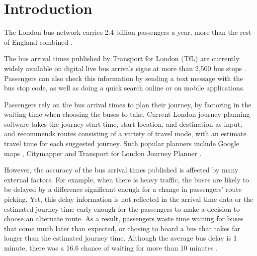 \chapter{Introduction}

The London bus network carries 2.4 billion passengers a year, more than the rest of England combined \cite{tfl_annual_report_13/14}.

\par The bus arrival times published by Transport for London (TfL) are currently widely available on digital live bus arrivals signs at more than 2,500 bus stops \cite{live_bus_arrivals}. Passengers can also check this information by sending a text message with the bus stop code, as well as doing a quick search online or on mobile applications.



\par Passengers rely on the bus arrival times to plan their journey, by factoring in the waiting time when choosing the buses to take. Current London journey planning software takes the journey start time, start location, and destination as input, and recommends routes consisting of a variety of travel mode, with an estimate travel time for each suggested journey. Such popular planners include Google maps \cite{google_maps}, Citymapper \cite{citymapper} and Transport for London Journey Planner \cite{tfl_journey_planner}.

\par However, the accuracy of the bus arrival times published is affected by many external factors. For example, when there is heavy traffic, the buses are likely to be delayed by a difference significant enough for a change in passengers' route picking. Yet, this delay information is not reflected in the arrival time data or the estimated journey time early enough for the passengers to make a decision to choose an alternate route. As a result, passengers waste time waiting for buses that come much later than expected, or chosing to board a bus that takes far longer than the estimated journey time. Although the average bus delay is 1 minute, there was a 16.6 chance of waiting for more than 10 minutes \cite{buses_performance_data}.

